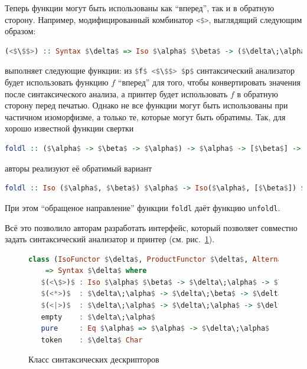 Теперь функции могут быть использованы как ``вперед'', так и в обратную сторону. Например, модифицированный комбинатор 
\lstinline[language=Haskell]{<$>}, выглядящий следующим образом:

\begin{lstlisting}[language=Haskell,mathescape]
   (<$\$$>) :: Syntax $\delta$ => Iso $\alpha$ $\beta$ -> ($\delta\;\alpha$ -> $\delta\;\beta$)
\end{lstlisting}

\noindent выполняет следующие функции: из \lstinline[language=Haskell,mathescape]{$f$ <$\$$> $p$} синтаксический анализатор будет 
использовать функцию $f$ ``вперед'' для того, чтобы конвертировать значения после синтаксического анализа, а принтер будет использовать 
$f$ в обратную сторону перед печатью. Однако не все функции могут быть использованы при частичном изоморфизме, а только те, 
которые могут быть обратимы. Так, для хорошо известной функции свертки

\begin{lstlisting}[mathescape,language=Haskell]
   foldl :: ($\alpha$ -> $\beta$ -> $\alpha$) -> $\alpha$ -> [$\beta$] -> $\alpha$
\end{lstlisting}

авторы реализуют её обратимый вариант

\begin{lstlisting}[mathescape,language=Haskell]
   foldl :: Iso ($\alpha$, $\beta$) $\alpha$ -> Iso($\alpha$, [$\beta$]) $\alpha$
\end{lstlisting}

При этом ``обращеное направление'' функции \lstinline{foldl} даёт функцию \lstinline{unfoldl}.

Всё это позволило авторам разработать интерфейс, который позволяет совместно задать синтаксический анализатор и принтер (см. рис.~\ref{ClassSyntDesc}).

\begin{figure}[ht]
\centering
\begin{lstlisting}[mathescape,language = haskell]
class (IsoFunctor $\delta$, ProductFunctor $\delta$, Alternative $\delta$) 
    => Syntax $\delta$ where
   $(<\$>)$ : Iso $\alpha$ $\beta$ -> $\delta\;\alpha$ -> $\delta\;\beta$
   $(<*>)$  : $\delta\;\alpha$ -> $\delta\;\beta$ -> $\delta$ ($\alpha$, $\beta$)
   $(<|>)$  : $\delta\;\alpha$ -> $\delta\;\alpha$ -> $\delta\;\alpha$
   empty    : $\delta\;\alpha$
   pure     : Eq $\alpha$ => $\alpha$ -> $\delta\;\alpha$
   token    : $\delta$ Char
\end{lstlisting}
\caption{Класс синтаксических дескрипторов}
\label{ClassSyntDesc}
\end{figure}

